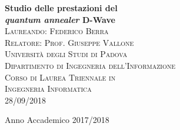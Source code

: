\begin{titlepage}
\begin{center}


{\LARGE \bfseries Studio delle prestazioni del\\ \textit{quantum annealer} D-Wave}\\[2cm]

\textsc{\large Laureando: Federico Berra}\\
\textsc{\large Relatore: Prof. Giuseppe Vallone}\\[0.5cm]

\textsc{\LARGE Universit\`{a} degli Studi di Padova}\\[1.2cm]
\textsc{\Large Dipartimento di Ingegneria dell'Informazione}\\[0.8cm]
\textsc{\Large Corso di Laurea Triennale in}\\[0.5cm]
\textsc{\Large Ingegneria Informatica}\\[2cm]
\textsc{\large 28/09/2018}\\
\vfill

{\large Anno Accademico 2017/2018}
\end{center}
\end{titlepage}
